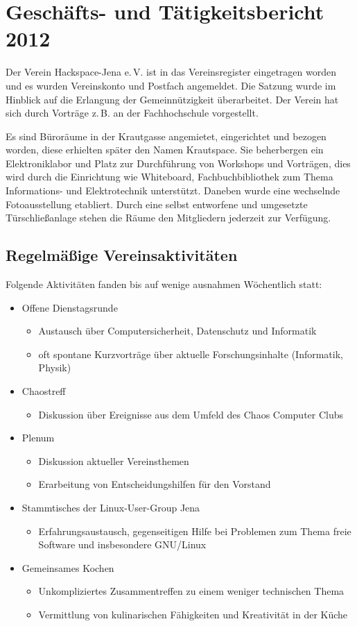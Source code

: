 \documentclass[10pt, a4paper]{scrartcl}
\begin{document}
\section*{Geschäfts- und Tätigkeitsbericht 2012}
Der Verein Hackspace-Jena e.\,V. ist in das Vereinsregister eingetragen worden und
es wurden Vereinskonto und Postfach angemeldet.
Die Satzung wurde im Hinblick auf die Erlangung der Gemeinnützigkeit überarbeitet.
Der Verein hat sich durch Vorträge z.\,B. an der Fachhochschule vorgestellt.

Es sind Büroräume in der Krautgasse angemietet, eingerichtet und bezogen worden,
diese erhielten später den Namen Krautspace.
Sie beherbergen ein Elektroniklabor und Platz zur Durchführung von Workshops und Vorträgen,
dies wird durch die Einrichtung wie Whiteboard,
Fachbuchbibliothek zum Thema Informations- und Elektrotechnik unterstützt.
Daneben wurde eine wechselnde Fotoausstellung etabliert.
Durch eine selbst entworfene und umgesetzte Türschließanlage stehen die Räume den Mitgliedern jederzeit zur Verfügung. 

\subsection*{Regelmäßige Vereinsaktivitäten}
Folgende Aktivitäten fanden bis auf wenige ausnahmen Wöchentlich statt:
\begin{itemize}
	\item Offene Dienstagsrunde
		\begin{itemize}
			\item Austausch über Computersicherheit, Datenschutz und Informatik
			\item oft spontane Kurzvorträge über aktuelle Forschungsinhalte (Informatik, Physik)
		\end{itemize}
	\item Chaostreff
		\begin{itemize}
			\item Diskussion über Ereignisse aus dem Umfeld des Chaos Computer Clubs
		\end{itemize}
	\item Plenum
		\begin{itemize}
			\item Diskussion aktueller Vereinsthemen
			\item Erarbeitung von Entscheidungshilfen für den Vorstand
		\end{itemize}
	\item Stammtisches der Linux-User-Group Jena
		\begin{itemize}
			\item Erfahrungsaustausch, gegenseitigen Hilfe bei Problemen zum Thema freie Software und insbesondere GNU/Linux
		\end{itemize}
	\item Gemeinsames Kochen
		\begin{itemize}
			\item Unkompliziertes Zusammentreffen zu einem weniger technischen Thema
			\item Vermittlung von kulinarischen Fähigkeiten und Kreativität in der Küche
		\end{itemize}
\end{itemize}
\end{document}
